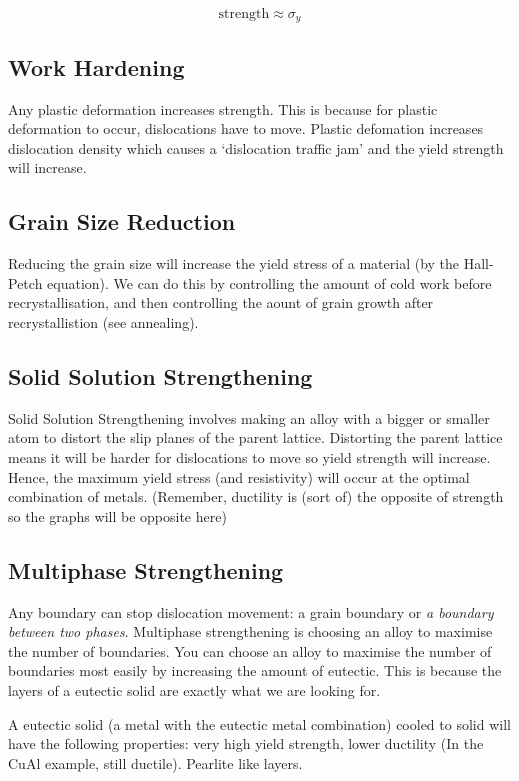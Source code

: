 \documentclass[12pt]{article}
\begin{document}
\begin{equation*}
  \text{strength} \approx \sigma_y
\end{equation*}

\subsection{Work Hardening}
Any plastic deformation increases strength.
This is because for plastic deformation to occur, dislocations have to move. 
Plastic defomation increases dislocation density which causes a `dislocation traffic jam' and the yield strength will increase.

\subsection{Grain Size Reduction}
Reducing the grain size will increase the yield stress of a material (by the Hall-Petch equation).
We can do this by controlling the amount of cold work before recrystallisation, and then controlling the aount of grain growth after recrystallistion (see annealing).

\subsection{Solid Solution Strengthening}
Solid Solution Strengthening involves making an alloy with a bigger or smaller atom to distort the slip planes of the parent lattice.
Distorting the parent lattice means it will be harder for dislocations to move so yield strength will increase.
Hence, the maximum yield stress (and resistivity) will occur at the optimal combination of metals.
(Remember, ductility is (sort of) the opposite of strength so the graphs will be opposite here)

\subsection{Multiphase Strengthening}
Any boundary can stop dislocation movement: a grain boundary or \textit{a boundary between two phases}. 
Multiphase strengthening is choosing an alloy to maximise the number of boundaries.
You can choose an alloy to maximise the number of boundaries most easily by increasing the amount of eutectic. 
This is because the layers of a eutectic solid are exactly what we are looking for.

A eutectic solid (a metal with the eutectic metal combination) cooled to solid will have the following properties:
very high yield strength, lower ductility (In the CuAl example, still ductile). Pearlite like layers.
\end{document}
